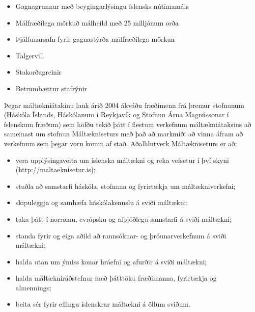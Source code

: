 \begin{multicols}{2}
\begin{itemize}
\item Gagnagrunnur með beygingarlýsingu íslensks nútímamáls
\item Málfræðilega mörkuð málheild með 25 milljónum orða 
\item Þjálfunarsafn fyrir gagnastýrða málfræðilega mörkun
\item Talgervill
\item Stakorðagreinir 
\item Betrumbættur stafrýnir
\end{itemize}

Þegar máltækniátakinu lauk árið 2004 ákváðu fræðimenn frá þremur stofnunum (Háskóla Íslands, Háskólanum í Reykjavík og Stofnun Árna Magnússonar í íslenskum fræðum) sem höfðu tekið þátt í flestum verkefnum máltækniátaksins að sameinast um stofnun Máltækniseturs með það að markmiði að vinna áfram að verkefnum sem þegar voru komin af stað. Aðalhlutverk Máltækniseturs er að:

\begin{itemize}
\item vera upplýsingaveita um íslenska máltækni og reka vefsetur í því skyni (http://maltaeknisetur.is); 
\item stuðla að samstarfi háskóla, stofnana og fyrirtækja um máltækniverkefni;
\item skipuleggja og samhæfa háskólakennslu á sviði máltækni;
\item taka þátt í norrænu, evrópsku og alþjóðlegu samstarfi á sviði máltækni;
\item standa fyrir og eiga aðild að rannsóknar- og þróunarverkefnum á sviði máltækni;
\item halda utan um ýmiss konar hráefni og afurðir á sviði máltækni;
\item halda máltækniráðstefnur með þátttöku fræði\-manna, fyrirtækja og almennings;
\item beita sér fyrir eflingu íslenskrar máltækni á öllum sviðum.
\end{itemize}


\end{multicols}
